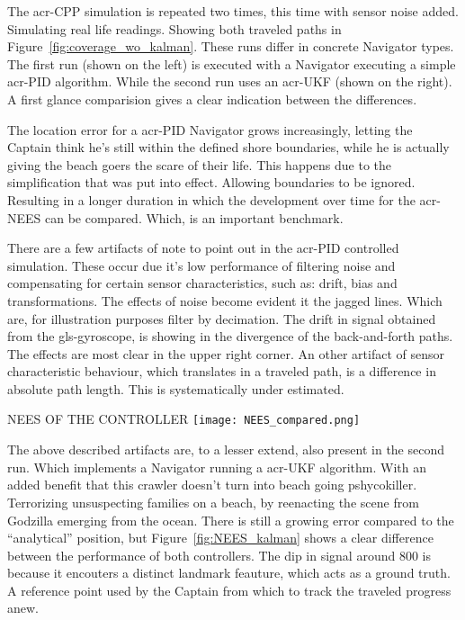 The \gls{acr-CPP} simulation is repeated two times, this time with sensor noise added. Simulating real life readings.
Showing both traveled paths in Figure~\ref{fig:coverage_wo_kalman}. These runs differ in concrete Navigator types. The
first run (shown on the left) is executed with a Navigator executing a simple \gls{acr-PID} algorithm. While the
second run uses an \gls{acr-UKF} (shown on the right). A first glance comparision gives a clear indication between the
differences.

The location error for a \gls{acr-PID} Navigator grows increasingly, letting the Captain think he's still within
the defined shore boundaries, while he is actually giving the beach goers the scare of their life. This happens due
to the simplification that was put into effect. Allowing boundaries to be ignored. Resulting in a longer duration in
which the development over time for the \gls{acr-NEES} can be compared. Which, is an important benchmark.

There are a few artifacts of note to point out in the \gls{acr-PID} controlled simulation. These occur due it's
low performance of filtering noise and compensating for certain sensor characteristics, such as: drift, bias and
transformations. The effects of noise become evident it the jagged lines. Which are, for illustration purposes
filter by decimation. The drift in signal obtained from the \gls{gls-gyroscope}, is showing in the divergence
of the back-and-forth paths. The effects are most clear in the upper right corner. An other artifact of sensor
characteristic behaviour, which translates in a traveled path, is a difference in absolute path length. This is
systematically under estimated.

\begin{RoyalFigure}[htb, label=fig:NEES_kalman]{NEES OF THE CONTROLLER}
    \texttt{[image: NEES\_compared.png]}
\end{RoyalFigure}

The above described artifacts are, to a lesser extend, also present in the second run. Which implements a
Navigator running a \gls{acr-UKF} algorithm. With an added benefit that this crawler doesn't turn into beach going
pshycokiller. Terrorizing unsuspecting families on a beach, by reenacting the scene from Godzilla emerging from the
ocean. There is still a growing error compared to the ``analytical'' position, but Figure~\ref{fig:NEES_kalman}
shows a clear difference between the performance of both controllers. The dip in signal around \( 800 \) is because
it encouters a distinct landmark feauture, which acts as a ground truth. A reference point used by the Captain from
which to track the traveled progress anew.